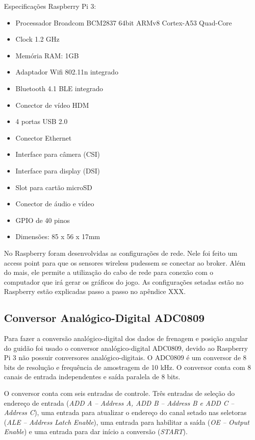 Especificações Raspberry Pi 3:
\begin{itemize}
\item Processador Broadcom BCM2837 64bit ARMv8 Cortex-A53 Quad-Core
\item Clock 1.2 GHz
\item Memória RAM: 1GB
\item Adaptador Wifi 802.11n integrado
\item Bluetooth 4.1 BLE integrado
\item Conector de vídeo HDM
\item 4 portas USB 2.0
\item Conector Ethernet
\item Interface para câmera (CSI)
\item Interface para display (DSI)
\item Slot para cartão microSD
\item Conector de áudio e vídeo
\item GPIO de 40 pinos
\item Dimensões: 85 x 56 x 17mm
\end{itemize}

No Raspberry foram desenvolvidas as configurações de rede. Nele foi feito um access point para que os sensores wireless pudessem se conectar ao broker. Além do mais, ele permite a utilização do cabo de rede para conexão com o computador que irá gerar os gráficos do jogo. As configurações setadas estão no Raspberry estão explicadas passo a passo no apêndice XXX.
\subsection{Conversor Analógico-Digital ADC0809}

	Para fazer a conversão analógico-digital dos dados de frenagem e posição angular do guidão foi usado o conversor analógico-digital ADC0809, devido ao Raspberry Pi 3 não possuir conversores analógico-digitais. O ADC0809 é um conversor de 8 bits de resolução e frequência de amostragem de 10 kHz. O conversor conta com 8 canais de entrada independentes e saída paralela de 8 bits. 

	O conversor conta com seis entradas de controle. Três entradas de seleção do endereço de entrada (\textit{ADD A – Address A, ADD B – Address B e ADD C – Address C}), uma entrada para atualizar o endereço do canal setado nas seletoras (\textit{ALE – Address Latch Enable}), uma entrada para habilitar a saída (\textit{OE – Output Enable}) e uma entrada para dar início a conversão (\textit{START}).

